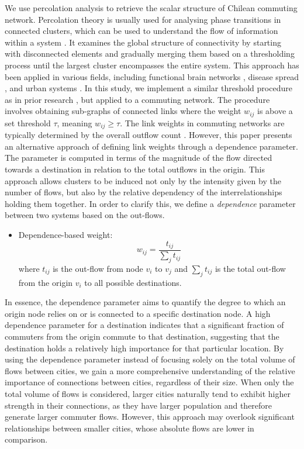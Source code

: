 \documentclass[11pt, a4paper]{article}
\begin{document}
We use percolation analysis to retrieve the scalar structure of Chilean commuting network. Percolation theory is usually used for analysing phase transitions in connected clusters, which can be used to understand the flow of information within a system \citep{Gallos2011}. It examines the global structure of connectivity by starting with disconnected elements and gradually merging them based on a thresholding process until the largest cluster encompasses the entire system. This approach has been applied in various fields, including functional brain networks \citep{Gallos2011}, disease spread \citep{Newman2002, Gallos2012}, and urban systems \citep{Rozenfeld2008, Rozenfeld2011, Fluschnik2016, Arcaute2016, Piovani2017, Behnisch2019, Sarkar2020}. In this study, we implement a similar threshold procedure as in prior research \citep{Arcaute2016,Piovani2017}, but applied to a commuting network. The procedure involves obtaining sub-graphs of connected links where the weight $w_{ij}$ is above a set threshold $\tau$, meaning $w_{ij} \geq \tau$. The link weights in commuting networks are typically determined by the overall outflow count \citep{Rabino1997}. However, this paper presents an alternative approach of defining link weights through a dependence parameter. The parameter is computed in terms of the magnitude of the flow directed towards a destination in relation to the total outflows in the origin. This approach allows clusters to be induced not only by the intensity given by the number of flows, but also by the relative dependency of the interrelationships holding them together. In order to clarify this, we define a \textit{dependence} parameter between two systems based on the out-flows.

\begin{itemize}
\item Dependence-based weight:
\begin{equation}
  w_{ij}= \frac{t_{ij}}{\sum_{j}  t_{ij}}
\end{equation} 
where $ t_{ij}$ is the out-flow from node $v_{i}$ to $v_{j}$ and $\sum_{j}  t_{ij}$ is the total out-flow from the origin $v_{i}$ to all possible destinations.
\end{itemize}

In essence, the dependence parameter aims to quantify the degree to which an origin node relies on or is connected to a specific destination node. A high dependence parameter for a destination indicates that a significant fraction of commuters from the origin commute to that destination, suggesting that the destination holds a relatively high importance for that particular location. By using the dependence parameter instead of focusing solely on the total volume of flows between cities, we gain a more comprehensive understanding of the relative importance of connections between cities, regardless of their size. When only the total volume of flows is considered, larger cities naturally tend to exhibit higher strength in their connections, as they have larger population and therefore generate larger commuter flows. However, this approach may overlook significant relationships between smaller cities, whose absolute flows are lower in comparison.
\end{document}
